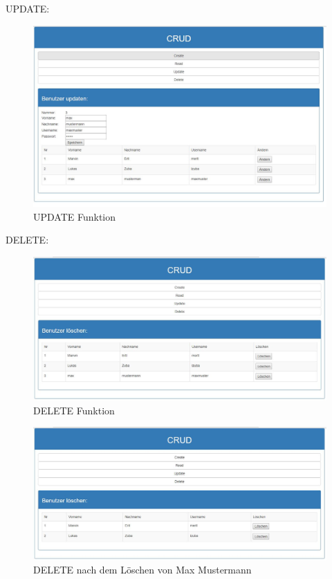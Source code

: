 UPDATE:
\begin{figure}[H]
	\centering
	\includegraphics[width=0.9\linewidth]{images/update}
	\caption{UPDATE Funktion}
	\label{fig:update}
\end{figure}

DELETE:
\begin{figure}[H]
	\centering
	\includegraphics[width=1\linewidth]{images/delete}
	\caption{DELETE Funktion}
	\label{fig:delete}
\end{figure}

\begin{figure}[H]
	\centering
	\includegraphics[width=1\linewidth]{images/delete_after}
	\caption{DELETE nach dem Löschen von Max Mustermann}
	\label{fig:deleteafter}
\end{figure}
